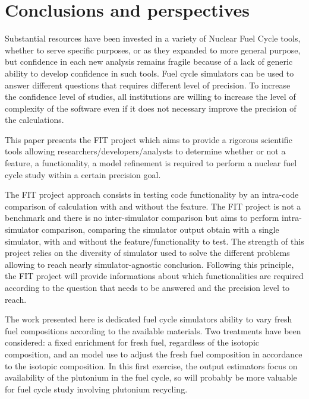 \section{Conclusions and perspectives}

Substantial resources have been invested in a variety of Nuclear Fuel Cycle
tools, whether to serve specific purposes, or as they expanded to more general
purpose, but confidence in each new analysis remains fragile because of a lack
of generic ability to develop confidence in such tools.
Fuel cycle simulators can be used to answer different questions that requires
different level of precision. To increase the confidence level of studies, all
institutions are willing to increase the level of complexity of the software
even if it does not necessary improve the precision of the calculations. 

This paper presents the FIT project which aims to provide a rigorous scientific
tools allowing researchers/developers/analysts to determine whether or not a
feature, a functionality, a model refinement is required to perform a nuclear
fuel cycle study within a certain precision goal.

The FIT project approach consists in testing code functionality by an intra-code
comparison of calculation with and without the feature. The FIT project is not a
benchmark and there is no inter-simulator comparison but aims to perform
intra-simulator comparison, comparing the simulator output obtain with a single
simulator, with and without the feature/functionality to test. The strength of
this project relies on the diversity of simulator used to solve the different
problems allowing to reach nearly simulator-agnostic conclusion. Following this
principle, the FIT project will provide informations about which functionalities
are required according to the question that needs to be answered and the
precision level to reach.

The work presented here is dedicated fuel cycle simulators ability to vary fresh
fuel compositions according to the available materials. Two treatments have been
considered: a fixed enrichment for fresh fuel, regardless of the isotopic
composition, and an model use to adjust the fresh fuel composition in accordance
to the isotopic composition. In this first exercise, the output estimators focus
on availability of the plutonium in the fuel cycle, so will probably be more
valuable for fuel cycle study involving plutonium recycling.

